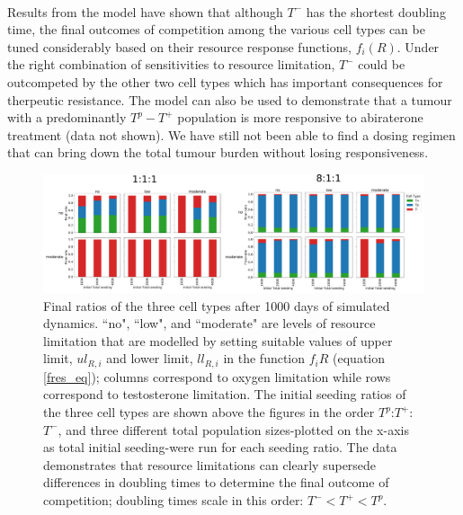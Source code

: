 \documentclass[12pt,onecolumn,twoside]{article}
\begin{document}
	\paragraph{\empty}Results from the model have shown that although $T^-$ has the shortest doubling time, the final outcomes of competition among the various cell types can be tuned considerably based on their resource response functions, $f_i(R)$. Under the right combination of sensitivities to resource limitation, $T^-$ could be outcompeted by the other two cell types which has important consequences for therpeutic resistance. The model can also be used to demonstrate that a tumour with a predominantly $T^p-T^+$ population is more responsive to abiraterone treatment (data not shown). We have still not been able to find a dosing regimen that can bring down the total tumour burden without losing responsiveness.
	\begin{figure}
	\centering
		\includegraphics[width=\textwidth]{fig2}
		\caption{\small Final ratios of the three cell types after 1000 days of simulated dynamics. ``no", ``low", and ``moderate" are levels of resource limitation that are modelled by setting suitable values of upper limit, $ul_{R,i}$ and lower limit, $ll_{R,i}$ in the function $f_i{R}$ (equation \ref{fres_eq}); columns correspond to oxygen limitation while rows correspond to testosterone limitation. The initial seeding ratios of the three cell types are shown above the figures in the order $T^p$:$T^+$:$T^-$, and three different total population sizes-plotted on the x-axis as total initial seeding-were run for each seeding ratio. The data demonstrates that resource limitations can clearly supersede differences in doubling times to determine the final outcome of competition; doubling times scale in this order: $T^- < T^+ < T^p$.}
	\end{figure}
\end{document}
